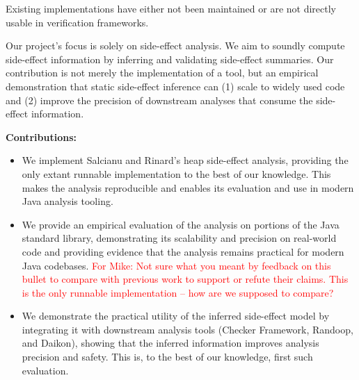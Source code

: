 \documentclass{article}
\begin{document}
Existing implementations \cite{helm2018unified, MadhavanPurity2011, salcianu2004combined} have either not been maintained or are not directly usable in verification frameworks.

Our project's focus is solely on side-effect analysis. We aim to soundly compute side-effect information by inferring and validating side-effect summaries. Our contribution is not merely the implementation of a tool, but an empirical demonstration that static side-effect inference can (1) scale to widely used code and (2) improve the precision of downstream analyses that consume the side-effect information. \newline

\textbf{Contributions:}
\begin{itemize}
\item We implement Salcianu and Rinard's \cite{salcianu2004combined} heap side-effect analysis, providing the only extant runnable implementation to the best of our knowledge. This makes the analysis reproducible and enables its evaluation and use in modern Java analysis tooling.

\item We provide an empirical evaluation of the analysis on portions of the Java standard library, demonstrating its scalability and precision on real-world code and providing evidence that the analysis remains practical for modern Java codebases. \textcolor{red}{For Mike: Not sure what you meant by feedback on this bullet to compare with previous work to support or refute their claims. This is the only runnable implementation -- how are we supposed to compare?}

\item We demonstrate the practical utility of the inferred side-effect model by integrating it with downstream analysis tools (Checker Framework, Randoop, and Daikon), showing that the inferred information improves analysis precision and safety. This is, to the best of our knowledge, first such evaluation.

\end{itemize}
\end{document}
